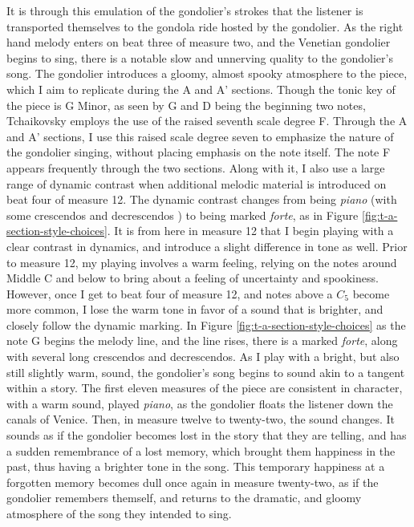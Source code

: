It is through this emulation of the gondolier's strokes that the listener is transported themselves to the gondola ride hosted by the gondolier. As the right hand melody enters on beat three of measure two, and the Venetian gondolier begins to sing, there is a notable slow and unnerving quality to the gondolier's song. The gondolier introduces a gloomy, almost spooky atmosphere to the piece, which I aim to replicate during the A and A' sections. Though the tonic key of the piece is G Minor, as seen by G and D being the beginning two notes, Tchaikovsky employs the use of the raised seventh scale degree F\musSharp{}. Through the A and A' sections, I use this raised scale degree seven to emphasize the nature of the gondolier singing, without placing emphasis on the note itself. The note F\musSharp{} appears frequently through the two sections. Along with it, I also use a large range of dynamic contrast when additional melodic material is introduced on beat four of measure 12. The dynamic contrast changes from being \textit{piano} (with some crescendos and decrescendos ) to being marked \textit{forte}, as in Figure \ref{fig:t-a-section-style-choices}\autocite{Henle_2002}. It is from here in measure 12 that I begin playing with a clear contrast in dynamics, and introduce a slight difference in tone as well. Prior to measure 12, my playing involves a warm feeling, relying on the notes around Middle C and below to bring about a feeling of uncertainty and spookiness. However, once I get to beat four of measure 12, and notes above a $C_5$ become more common, I lose the warm tone in favor of a sound that is brighter, and closely follow the dynamic marking. In Figure \ref{fig:t-a-section-style-choices}\autocite{Henle_2002} as the note G begins the melody line, and the line rises, there is a marked \textit{forte}, along with several long crescendos and decrescendos. As I play with a bright, but also still slightly warm, sound, the gondolier's song begins to sound akin to a tangent within a story. The first eleven measures of the piece are consistent in character, with a warm sound, played \textit{piano}, as the gondolier floats the listener down the canals of Venice. Then, in measure twelve to twenty-two, the sound changes. It sounds as if the gondolier becomes lost in the story that they are telling, and has a sudden remembrance of a lost memory, which brought them happiness in the past, thus having a brighter tone in the song. This temporary happiness at a forgotten memory becomes dull once again in measure twenty-two, as if the gondolier remembers themself, and returns to the dramatic, and gloomy atmosphere of the song they intended to sing.

